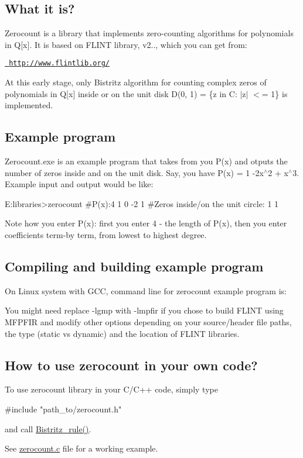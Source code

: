 \subsection*{What it is?}

Zerocount is a library that implements zero-\/counting algorithms for polynomials in Q\mbox{[}x\mbox{]}. It is based on F\+L\+I\+NT library, v2.., which you can get from\+:

\href{http://www.flintlib.org/}{\texttt{ http\+://www.\+flintlib.\+org/}}

At this early stage, only Bistritz algorithm for counting complex zeros of polynomials in Q\mbox{[}x\mbox{]} inside or on the unit disk D(0, 1) = \{z in C\+: $\vert$z$\vert$ $<$= 1\} is implemented.

\subsection*{Example program}

\textquotesingle{}Zerocount.\+exe\textquotesingle{} is an example program that takes from you P(x) and otputs the number of zeros inside and on the unit disk. Say, you have P(x) = 1 -\/2x$^\wedge$2 + x$^\wedge$3. Example input and output would be like\+: \begin{DoxyVerb}E:\my libraries\zerocount>zerocount
#P(x):4 1 0 -2 1
#Zeros inside/on the unit circle:
1 1
\end{DoxyVerb}


Note how you enter P(x)\+: first you enter 4 -\/ the length of P(x), then you enter coefficients term-\/by term, from lowest to highest degree.

\subsection*{Compiling and building example program}

On Linux system with G\+CC, command line for \textquotesingle{}zerocount\textquotesingle{} example program is\+: 


You might need replace -\/lgmp with -\/lmpfir if you chose to build F\+L\+I\+NT using M\+F\+P\+F\+IR and modify other options depending on your source/header file paths, the type (static vs dynamic) and the location of F\+L\+I\+NT libraries.

\subsection*{How to use zerocount in your own code?}

To use zerocount library in your C/\+C++ code, simply type \begin{DoxyVerb}#include "path_to/zerocount.h"
\end{DoxyVerb}


and call {\ttfamily \mbox{\hyperlink{bistritz_8c_abac08110815e4b854dc83dd15f914fd6}{Bistritz\+\_\+rule()}}}.

See \mbox{\hyperlink{zerocount_8c}{zerocount.\+c}} file for a working example. 